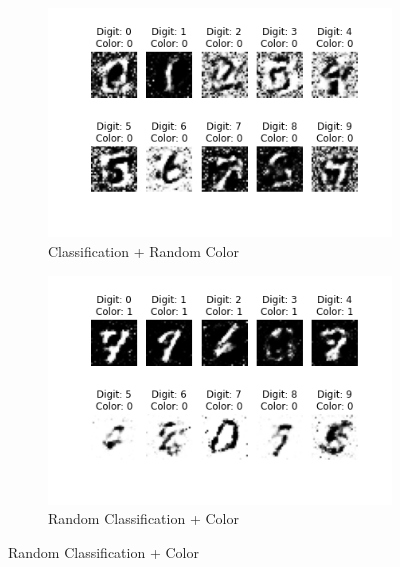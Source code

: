 \documentclass[11pt, letterpaper, oneside]{article}
\begin{document}

\begin{figure}
    \begin{subfigure}{.5\textwidth}
      \centering
      \includegraphics[width=1\linewidth]{Digit_Color_ZSL.png}  
      \caption{Classification + Random Color}
      \label{fig:sub-first}
    \end{subfigure}
    \begin{subfigure}{.5\textwidth}
      \centering
      \includegraphics[width=1\linewidth]{Digit_ZSJ_Color.png}  
      \caption{Random Classification + Color}
      \label{fig:sub-second}
    \end{subfigure}


\end{figure}
\end{document}
